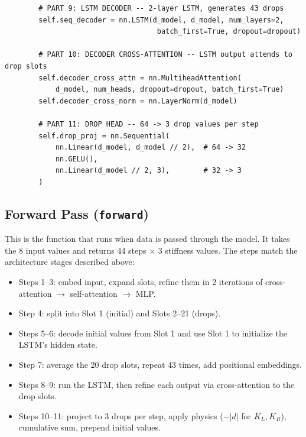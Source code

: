 \documentclass[11pt,a4paper]{article}
\begin{document}
\begin{lstlisting}
        # PART 9: LSTM DECODER -- 2-layer LSTM, generates 43 drops
        self.seq_decoder = nn.LSTM(d_model, d_model, num_layers=2,
                                    batch_first=True, dropout=dropout)

        # PART 10: DECODER CROSS-ATTENTION -- LSTM output attends to drop slots
        self.decoder_cross_attn = nn.MultiheadAttention(
            d_model, num_heads, dropout=dropout, batch_first=True)
        self.decoder_cross_norm = nn.LayerNorm(d_model)

        # PART 11: DROP HEAD -- 64 -> 3 drop values per step
        self.drop_proj = nn.Sequential(
            nn.Linear(d_model, d_model // 2),  # 64 -> 32
            nn.GELU(),
            nn.Linear(d_model // 2, 3),        # 32 -> 3
        )
\end{lstlisting}

\newpage
\subsection{Forward Pass (\texttt{forward})}

This is the function that runs when data is passed through the model. It takes the 8 input values and returns 44 steps $\times$ 3 stiffness values. The steps match the architecture stages described above:
\begin{itemize}[nosep]
    \item Steps 1--3: embed input, expand slots, refine them in 2 iterations of cross-attention $\to$ self-attention $\to$ MLP.
    \item Step 4: split into Slot 1 (initial) and Slots 2--21 (drops).
    \item Steps 5--6: decode initial values from Slot 1 and use Slot 1 to initialize the LSTM's hidden state.
    \item Step 7: average the 20 drop slots, repeat 43 times, add positional embeddings.
    \item Steps 8--9: run the LSTM, then refine each output via cross-attention to the drop slots.
    \item Steps 10--11: project to 3 drops per step, apply physics ($-|d|$ for $K_L, K_R$), cumulative sum, prepend initial values.
\end{itemize}
\end{document}
